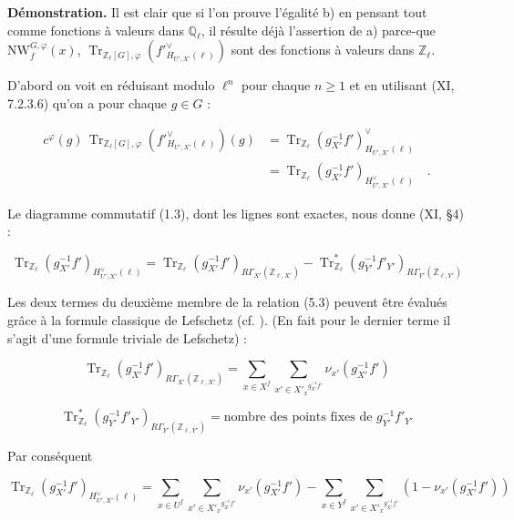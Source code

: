 \documentclass[11pt]{article}
\newcommand{\Q}{\mathbb{Q}}
\providecommand{\Tr}{\operatorname{Tr}}
\providecommand{\Tr}{\operatorname{Tr}}
\providecommand{\Tr}{\operatorname{Tr}}
\providecommand{\Tr}{\operatorname{Tr}}
\providecommand{\bZ}{\mathbb Z}
\providecommand{\Tr}{\operatorname{Tr}}
\begin{document}
\noindent
\textbf{Démonstration.} Il est clair que si l'on prouve l'égalité b) en pensant tout comme fonctions à valeurs dans $\Q_\ell$, il résulte déjà l'assertion de a) parce-que $\mathrm{NW}^{G,\varphi}_{f}(x)$, $\Tr_{\bZ_\ell[G],\varphi}(f'^\vee_{H_{U',X'}(\ell)})$ sont des fonctions à valeurs dans $\bZ_\ell$.

D'abord on voit en réduisant modulo $\ell^n$ pour chaque $n \geq 1$ et en utilisant (XI, 7.2.3.6) qu'on a pour chaque $g \in G$ :

\begin{equation}\tag{5.2}
\begin{aligned}
c^\varphi(g) \, \Tr_{\bZ_\ell[G],\varphi}(f'^\vee_{H_{U',X'}(\ell)})(g)
&= \Tr_{\bZ_\ell}(g_{X'}^{-1}f')^\vee_{H_{U',X'}(\ell)}\\
&= \Tr_{\bZ_\ell}(g_{X'}^{-1}f')_{H^\vee_{U',X'}(\ell)} \quad .
\end{aligned}
\end{equation}

Le diagramme commutatif (1.3), dont les lignes sont exactes, nous donne (XI, \S4) :

\begin{equation}\tag{5.3}
\Tr_{\bZ_\ell}(g_{X'}^{-1}f')_{H^\vee_{U',X'}(\ell)} = \Tr_{\bZ_\ell}(g_{X'}^{-1}f')_{R\Gamma_{X'}(\bZ_{\ell,X'})} - \Tr^*_{\bZ_\ell}(g_{Y'}^{-1}f'_{Y'})_{R\Gamma_{Y'}(\bZ_{\ell,Y'})}
\end{equation}

Les deux termes du deuxième membre de la relation (5.3) peuvent être évalués grâce à la formule classique de Lefschetz (cf. ). (En fait pour le dernier terme il s'agit d'une formule triviale de Lefschetz) :

\begin{equation}\tag{5.4}
\Tr_{\bZ_\ell}(g_{X'}^{-1}f')_{R\Gamma_{X'}(\bZ_{\ell,X'})} = \sum_{x \in X^f} \sum_{x' \in {X'_x}^{g_{X'}^{-1}f'}} \nu_{x'}(g_{X'}^{-1}f')
\end{equation}

\begin{equation}\tag{5.5}
\Tr^*_{\bZ_\ell}(g_{Y'}^{-1}f'_{Y'})_{R\Gamma_{Y'}(\bZ_{\ell,Y'})} = \text{nombre des points fixes de } g_{Y'}^{-1}f'_{Y'}
\end{equation}

Par conséquent

\begin{equation}\tag{5.6}
\Tr_{\bZ_\ell}(g_{X'}^{-1}f')_{H^\vee_{U',X'}(\ell)} = \sum_{x \in U^f} \sum_{x' \in {X'_x}^{g_{X'}^{-1}f'}} \nu_{x'}(g_{X'}^{-1}f') - \sum_{x \in Y^f} \sum_{x' \in {X'_x}^{g_{X'}^{-1}f'}} (1 - \nu_{x'}(g_{X'}^{-1}f'))
\end{equation}
\end{document}

